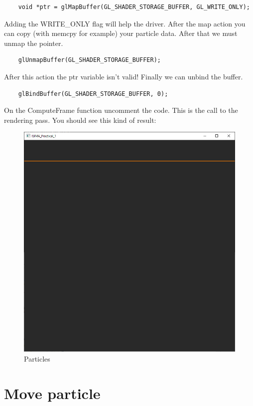 \documentclass{article}
\begin{document}
\begin{lstlisting}
	void *ptr = glMapBuffer(GL_SHADER_STORAGE_BUFFER, GL_WRITE_ONLY);
\end{lstlisting}
Adding the WRITE\_ONLY flag will help the driver. After the map action you can copy (with memcpy for example) your particle data. After that we must unmap the pointer.
\begin{lstlisting}
	glUnmapBuffer(GL_SHADER_STORAGE_BUFFER);
\end{lstlisting}
After this action the ptr variable isn't valid! Finally we can unbind the buffer.
\begin{lstlisting}
	glBindBuffer(GL_SHADER_STORAGE_BUFFER, 0);
\end{lstlisting}
On the ComputeFrame function uncomment the code. This is the call to the rendering pass. You should see this kind of result:
\begin{figure}[H]
	\centering
	\includegraphics[scale=0.5]{images/init_buffer.png}
	\caption{Particles}
\end{figure}

\section{Move particle}
\end{document}
